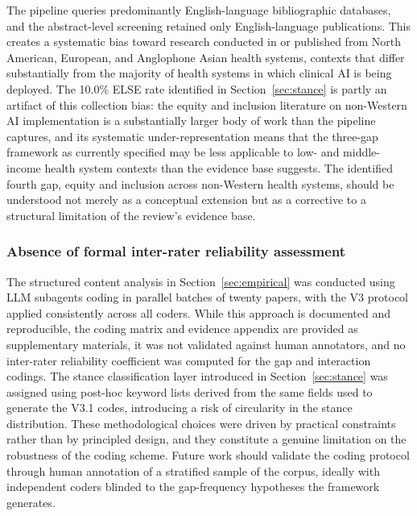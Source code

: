 The pipeline queries predominantly English-language bibliographic databases, and the abstract-level screening retained only English-language publications. This creates a systematic bias toward research conducted in or published from North American, European, and Anglophone Asian health systems, contexts that differ substantially from the majority of health systems in which clinical AI is being deployed. The 10.0\% ELSE rate identified in Section~\ref{sec:stance} is partly an artifact of this collection bias: the equity and inclusion literature on non-Western AI implementation is a substantially larger body of work than the pipeline captures, and its systematic under-representation means that the three-gap framework as currently specified may be less applicable to low- and middle-income health system contexts than the evidence base suggests. The identified fourth gap, equity and inclusion across non-Western health systems, should be understood not merely as a conceptual extension but as a corrective to a structural limitation of the review's evidence base.

\subsubsection{Absence of formal inter-rater reliability assessment}
\label{sec:limitation_inter_rater}

The structured content analysis in Section~\ref{sec:empirical} was conducted using LLM subagents coding in parallel batches of twenty papers, with the V3 protocol applied consistently across all coders. While this approach is documented and reproducible, the coding matrix and evidence appendix are provided as supplementary materials, it was not validated against human annotators, and no inter-rater reliability coefficient was computed for the gap and interaction codings. The stance classification layer introduced in Section~\ref{sec:stance} was assigned using post-hoc keyword lists derived from the same fields used to generate the V3.1 codes, introducing a risk of circularity in the stance distribution. These methodological choices were driven by practical constraints rather than by principled design, and they constitute a genuine limitation on the robustness of the coding scheme. Future work should validate the coding protocol through human annotation of a stratified sample of the corpus, ideally with independent coders blinded to the gap-frequency hypotheses the framework generates.
